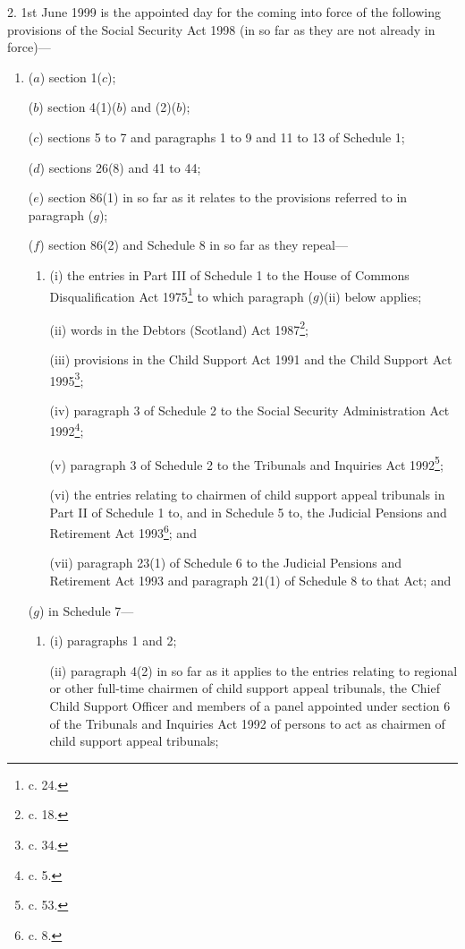 \documentclass[12pt,a4paper]{article}
\begin{document}
2.  1st June 1999 is the appointed day for the coming into force of the following provisions of the Social Security Act 1998 (in so far as they are not already in force)—
\begin{enumerate}\item[]
($a$) section 1($c$);

($b$) section 4(1)($b$) and (2)($b$);

($c$) sections 5 to 7 and paragraphs 1 to 9 and 11 to 13 of Schedule 1;

($d$) sections 26(8) and 41 to 44;

($e$) section 86(1) in so far as it relates to the provisions referred to in paragraph ($g$);

($f$) section 86(2) and Schedule 8 in so far as they repeal—
\begin{enumerate}\item[]
(i) the entries in Part III of Schedule 1 to the House of Commons Disqualification Act 1975\footnote{ c. 24.} to which paragraph ($g$)(ii) below applies;

(ii) words in the Debtors (Scotland) Act 1987\footnote{ c. 18.};

(iii) provisions in the Child Support Act 1991 and the Child Support Act 1995\footnote{ c. 34.};

(iv) paragraph 3 of Schedule 2 to the Social Security Administration Act 1992\footnote{ c. 5.};

(v) paragraph 3 of Schedule 2 to the Tribunals and Inquiries Act 1992\footnote{ c. 53.};

(vi) the entries relating to chairmen of child support appeal tribunals in Part II of Schedule 1 to, and in Schedule 5 to, the Judicial Pensions and Retirement Act 1993\footnote{ c. 8.}; and

(vii) paragraph 23(1) of Schedule 6 to the Judicial Pensions and Retirement Act 1993 and paragraph 21(1) of Schedule 8 to that Act; and
\end{enumerate}

($g$) in Schedule 7—
\begin{enumerate}\item[]
(i) paragraphs 1 and 2;

(ii) paragraph 4(2) in so far as it applies to the entries relating to regional or other full-time chairmen of child support appeal tribunals, the Chief Child Support Officer and members of a panel appointed under section 6 of the Tribunals and Inquiries Act 1992 of persons to act as chairmen of child support appeal tribunals;


\end{enumerate}
\end{enumerate}
\end{document}
